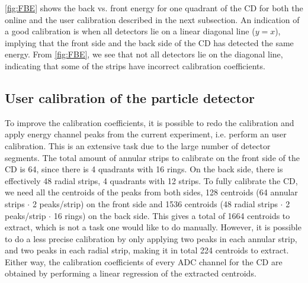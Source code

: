 \documentclass[twoside,english]{uiofysmaster/uiofysmaster}
\newcommand{\Sm}{$^{140}$Sm} %
\newcommand{\Pb}{$^{208}$Pb}
\let\orgautoref\autoref
\renewcommand{\autoref}
        {%
		 \def\sectionautorefname{Section}%
		 \def\subsectionautorefname{Section}%
		 \def\subsubsectionautorefname{Section}%
		 \def\chapterautorefname{Chapter}%
          \orgautoref}
\begin{document}
\autoref{fig:FBE} shows the back vs. front energy for one quadrant of the CD for both the online and the user calibration described in the next subsection.
An indication of a good calibration is when all detectors lie on a linear diagonal line ($y = x$), implying that the front side and the back side of the CD has detected the same energy. 
From \autoref{fig:FBE}, we see that not all detectors lie on the diagonal line, indicating that some of the strips have incorrect calibration coefficients.



\subsection{User calibration of the particle detector}\label{ssec:user_cal}


To improve the calibration coefficients, it is possible to redo the calibration and apply energy channel peaks from the current experiment, i.e. perform an user calibration. 
This is an extensive task due to the large number of detector segments. 
The total amount of annular strips to calibrate on the front side of the CD is 64, since there is 4 quadrants with 16 rings. 
On the back side, there is effectively 48 radial strips, 4 quadrants with 12 strips.
To fully calibrate the CD, we need all the centroids of the peaks from both sides, 128 centroids (64 annular strips $\cdot$ 2 peaks/strip) on the front side and 1536 centroids (48 radial strips $\cdot$ 2 peaks/strip $\cdot$ 16 rings) on the back side. 
This gives a total of 1664 centroids to extract, which is not a task one would like to do manually.
However, it is possible to do a less precise calibration by only applying two peaks in each annular strip, and two peaks in each radial strip, making it in total 224 centroids to extract. 
Either way, the calibration coefficients of every ADC channel for the CD are obtained by performing a linear regression of the extracted centroids.
\end{document}
